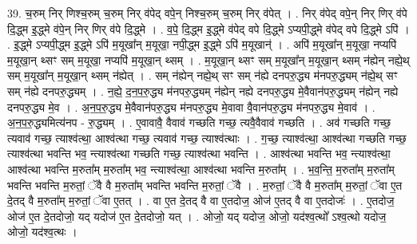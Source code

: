 \documentclass[17pt]{extarticle}
\begin{document}
39. च॒रुम् निर् णिश्च॒रुम् च॒रुम् निर् व॑पेद् वपे॒न् निश्च॒रुम् च॒रुम् निर् व॑पेत् । . निर् व॑पेद् वपे॒न् निर् णिर् व॑पे दि॒द्ध्म इ॒द्ध्मे व॑पे॒न् निर् णिर् व॑पे दि॒द्ध्मे । . व॒पे॒ दि॒द्ध्म इ॒द्ध्मे व॑पेद् वपे दि॒द्ध्मे ऽप्यपी॒द्ध्मे व॑पेद् वपे दि॒द्ध्मे ऽपि॑ । . इ॒द्ध्मे ऽप्यपी॒द्ध्म इ॒द्ध्मे ऽपि॑ म॒यूखा᳚न् म॒यूखा॒ नपी॒द्ध्म इ॒द्ध्मे ऽपि॑ म॒यूखान्॑ । . अपि॑ म॒यूखा᳚न् म॒यूखा॒ नप्यपि॑ म॒यूखा॒न् थ्सꣳ सम् म॒यूखा॒ नप्यपि॑ म॒यूखा॒न् थ्सम् । . म॒यूखा॒न् थ्सꣳ सम् म॒यूखा᳚न् म॒यूखा॒न् थ्सम् न॑ह्येन् नह्ये॒थ् सम् म॒यूखा᳚न् म॒यूखा॒न् थ्सम् न॑ह्येत् । . सम् न॑ह्येन् नह्ये॒थ् सꣳ सम् न॑ह्ये दनपरु॒द्ध्य म॑नपरु॒द्ध्यम् न॑ह्ये॒थ् सꣳ सम् न॑ह्ये दनपरु॒द्ध्यम् । . न॒ह्ये॒ द॒न॒प॒रु॒द्ध्य म॑नपरु॒द्ध्यम् न॑ह्येन् नह्ये दनपरु॒द्ध्य मे॒वैवान॑परु॒द्ध्यम् न॑ह्येन् नह्ये दनपरु॒द्ध्य मे॒व । . अ॒न॒प॒रु॒द्ध्य मे॒वैवान॑परु॒द्ध्य म॑नपरु॒द्ध्य मे॒वावा वै॒वान॑परु॒द्ध्य म॑नपरु॒द्ध्य मे॒वाव॑ । . अ॒न॒प॒रु॒द्ध्यमित्य॑नप - रु॒द्ध्यम् । . ए॒वावावै॒ वैवाव॑ गच्छति गच्छ॒ त्यवै॒वैवाव॑ गच्छति । . अव॑ गच्छति गच्छ॒ त्यवाव॑ गच्छ॒ त्याश्व॑त्था॒ आश्व॑त्था गच्छ॒ त्यवाव॑ गच्छ॒ त्याश्व॑त्थाः । . ग॒च्छ॒ त्याश्व॑त्था॒ आश्व॑त्था गच्छति गच्छ॒ त्याश्व॑त्था भवन्ति भव॒ न्त्याश्व॑त्था गच्छति गच्छ॒ त्याश्व॑त्था भवन्ति । . आश्व॑त्था भवन्ति भव॒ न्त्याश्व॑त्था॒ आश्व॑त्था भवन्ति म॒रुता᳚म् म॒रुता᳚म् भव॒ न्त्याश्व॑त्था॒ आश्व॑त्था भवन्ति म॒रुता᳚म् । . भ॒व॒न्ति॒ म॒रुता᳚म् म॒रुता᳚म् भवन्ति भवन्ति म॒रुतां॒ ॅवै वै म॒रुता᳚म् भवन्ति भवन्ति म॒रुतां॒ ॅवै । . म॒रुतां॒ ॅवै वै म॒रुता᳚म् म॒रुतां॒ ॅवा ए॒त दे॒तद् वै म॒रुता᳚म् म॒रुतां॒ ॅवा ए॒तत् । . वा ए॒त दे॒तद् वै वा ए॒तदोज॒ ओज॑ ए॒तद् वै वा ए॒तदोजः॑ । . ए॒तदोज॒ ओज॑ ए॒त दे॒तदोजो॒ यद् यदोज॑ ए॒त दे॒तदोजो॒ यत् । . ओजो॒ यद् यदोज॒ ओजो॒ यद॑श्व॒त्थो᳚ ऽश्व॒त्थो यदोज॒ ओजो॒ यद॑श्व॒त्थः । \newline
\end{document}
